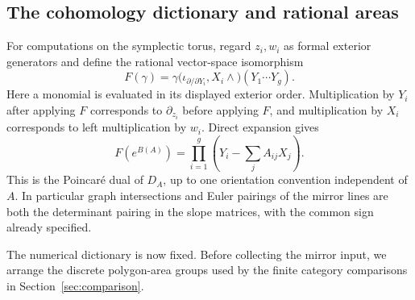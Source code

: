 \documentclass[11pt]{article}
\numberwithin{equation}{section}
\theoremstyle{definition}
\theoremstyle{remark}
\begin{document}
\subsection{The cohomology dictionary and rational areas}

For computations on the symplectic torus, regard $z_i,w_i$ as formal
exterior generators and define the rational vector-space isomorphism
\begin{equation}\label{eq:complement-transform}
 F(\gamma)=
 \gamma\bigl(\iota_{\partial/\partial Y_i},X_i\wedge\bigr)
 (Y_1\cdots Y_g).
\end{equation}
Here a monomial is evaluated in its displayed exterior order.
Multiplication by $Y_i$ after applying $F$ corresponds to
$\partial_{z_i}$ before applying $F$, and multiplication by $X_i$
corresponds to left multiplication by $w_i$.  Direct expansion gives
\begin{equation}\label{eq:graph-class}
 F(e^{B(A)})=\prod_{i=1}^g\left(Y_i-\sum_jA_{ij}X_j\right).
\end{equation}
This is the Poincar\'e dual of $D_A$, up to one orientation convention
independent of $A$.  In particular graph intersections and Euler
pairings of the mirror lines are both the determinant pairing in
the slope matrices, with the common sign already specified.

The numerical dictionary is now fixed.  Before collecting the mirror
input, we arrange the discrete polygon-area groups used by the finite
category comparisons in Section~\ref{sec:comparison}.
\end{document}
